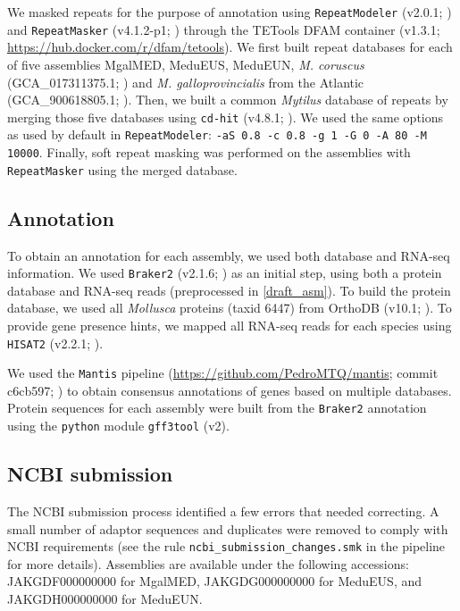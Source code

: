 \documentclass[11pt, a4paper]{article}
\begin{document}
We masked repeats for the purpose of annotation using \texttt{RepeatModeler} (v2.0.1; \cite{Flynn2020}) and \texttt{RepeatMasker} (v4.1.2-p1; \cite{Smit2013}) through the TETools DFAM container (v1.3.1; \url{https://hub.docker.com/r/dfam/tetools}).
We first built repeat databases for each of five assemblies MgalMED, MeduEUS, MeduEUN, \textit{M. coruscus} (GCA\_017311375.1; \cite{Yang2021}) and \textit{M. galloprovincialis} from the Atlantic (GCA\_900618805.1; \cite{Gerdol2020}).
Then, we built a common \textit{Mytilus} database of repeats by merging those five databases using \texttt{cd-hit} (v4.8.1; \cite{Fu2012}). We used the same options as used by default in \texttt{RepeatModeler}: \texttt{-aS 0.8 -c 0.8 -g 1 -G 0 -A 80 -M 10000}.
Finally, soft repeat masking was performed on the assemblies with \texttt{RepeatMasker} using the merged database.

\subsection{Annotation}

To obtain an annotation for each assembly, we used both database and RNA-seq information.
We used \texttt{Braker2} (v2.1.6; \cite{Bruna2021}) as an initial step, using both a protein database and RNA-seq reads (preprocessed in \cref{draft_asm}).
To build the protein database, we used all \textit{Mollusca} proteins (taxid 6447) from OrthoDB (v10.1; \cite{Kriventseva2019}).
To provide gene presence hints, we mapped all RNA-seq reads for each species using \texttt{HISAT2} (v2.2.1; \cite{Kim2019}).

We used the \texttt{Mantis} pipeline (\url{https://github.com/PedroMTQ/mantis}; commit c6cb597; \cite{Queiros2021}) to obtain consensus annotations of genes based on multiple databases.
Protein sequences for each assembly were built from the \texttt{Braker2} annotation using the \texttt{python} module \texttt{gff3tool} (v2).

\subsection{NCBI submission}

The NCBI submission process identified a few errors that needed correcting.
A small number of adaptor sequences and duplicates were removed to comply with NCBI requirements
(see the rule \texttt{ncbi\_submission\_changes.smk} in the pipeline for more details).
Assemblies are available under the following accessions: 
JAKGDF000000000 for MgalMED,
JAKGDG000000000 for MeduEUS,
and JAKGDH000000000 for MeduEUN.
\end{document}
